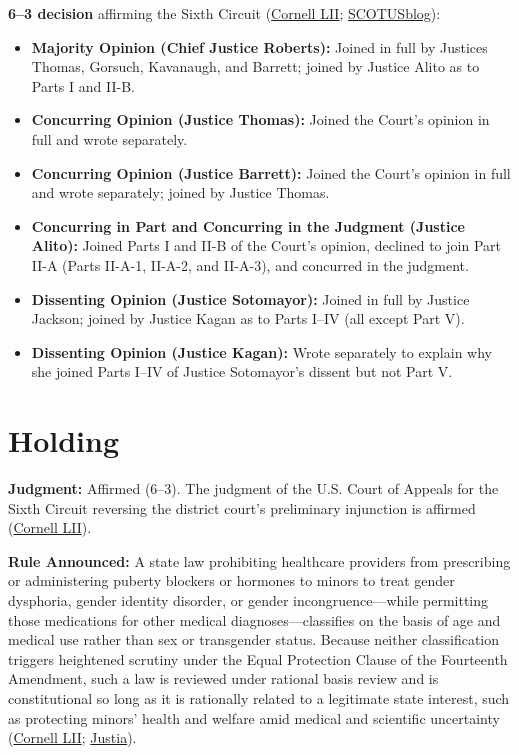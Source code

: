 \documentclass[12pt]{article}
\begin{document}
\textbf{6--3 decision} affirming the Sixth Circuit (\href{https://www.law.cornell.edu/supremecourt/text/23-477}{Cornell LII}; \href{https://www.scotusblog.com/cases/united-states-v-skrmetti/}{SCOTUSblog}):

\begin{itemize}
\item \textbf{Majority Opinion (Chief Justice Roberts):} Joined in full by Justices Thomas, Gorsuch, Kavanaugh, and Barrett; joined by Justice Alito as to Parts I and II-B.
\item \textbf{Concurring Opinion (Justice Thomas):} Joined the Court's opinion in full and wrote separately.
\item \textbf{Concurring Opinion (Justice Barrett):} Joined the Court's opinion in full and wrote separately; joined by Justice Thomas.
\item \textbf{Concurring in Part and Concurring in the Judgment (Justice Alito):} Joined Parts I and II-B of the Court's opinion, declined to join Part II-A (Parts II-A-1, II-A-2, and II-A-3), and concurred in the judgment.
\item \textbf{Dissenting Opinion (Justice Sotomayor):} Joined in full by Justice Jackson; joined by Justice Kagan as to Parts I--IV (all except Part V).
\item \textbf{Dissenting Opinion (Justice Kagan):} Wrote separately to explain why she joined Parts I--IV of Justice Sotomayor's dissent but not Part V.
\end{itemize}

\section{Holding}

\textbf{Judgment:} Affirmed (6--3). The judgment of the U.S. Court of Appeals for the Sixth Circuit reversing the district court's preliminary injunction is affirmed (\href{https://www.law.cornell.edu/supremecourt/text/23-477}{Cornell LII}).

\textbf{Rule Announced:} A state law prohibiting healthcare providers from prescribing or administering puberty blockers or hormones to minors to treat gender dysphoria, gender identity disorder, or gender incongruence---while permitting those medications for other medical diagnoses---classifies on the basis of age and medical use rather than sex or transgender status. Because neither classification triggers heightened scrutiny under the Equal Protection Clause of the Fourteenth Amendment, such a law is reviewed under rational basis review and is constitutional so long as it is rationally related to a legitimate state interest, such as protecting minors' health and welfare amid medical and scientific uncertainty (\href{https://www.law.cornell.edu/supremecourt/text/23-477}{Cornell LII}; \href{https://supreme.justia.com/cases/federal/us/605/23-477/}{Justia}).
\end{document}
